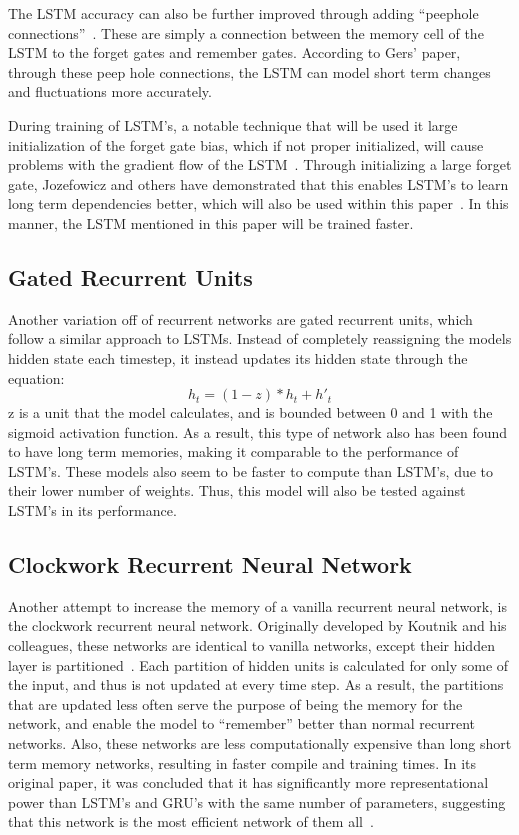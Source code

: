 \documentclass{article}
\begin{document}
The LSTM accuracy can also be further improved through adding ``peephole
connections''~\cite{lstmpeep}. These are simply a connection between the memory
cell of the LSTM to the forget gates and remember gates. According to Gers'
paper, through these peep hole connections, the LSTM can model short term
changes and fluctuations more accurately.

During training of LSTM's, a notable technique that will be used it large
initialization of the forget gate bias, which if not proper initialized, will
cause problems with the gradient flow of the LSTM~\cite{lstmbias}. Through
initializing a large forget gate, Jozefowicz and others have demonstrated that
this enables LSTM's to learn long term dependencies better, which will also be
used within this paper~\cite{lstmbias}. In this manner, the LSTM mentioned in
this paper will be trained faster.


\subsection{Gated Recurrent Units}
Another variation off of recurrent networks are gated recurrent units, which
follow a similar approach to LSTMs. Instead of completely reassigning the models
hidden state each timestep, it instead updates its hidden state through the
equation:
$$h_t = (1 - z) * h_t + h'_t $$
z is a unit that the model calculates, and is bounded between 0 and 1 with the
sigmoid activation function. As a result, this type of network also has been
found to have long term memories, making it comparable to the performance of
LSTM's. These models also seem to be faster to compute than LSTM's, due to their
lower number of weights. Thus, this model will also be tested against LSTM's in
its performance.


\subsection{Clockwork Recurrent Neural Network}
Another attempt to increase the memory of a vanilla recurrent neural network, is
the clockwork recurrent neural network. Originally developed by Koutnik and his
colleagues, these networks are identical to vanilla networks, except their
hidden layer is partitioned~\cite{cw-rnn}. Each partition of hidden units is
calculated for only some of the input, and thus is not updated at every time
step. As a result, the partitions that are updated less often serve the purpose
of being the memory for the network, and enable the model to ``remember'' better
than normal recurrent networks. Also, these networks are less computationally
expensive than long short term memory networks, resulting in faster compile and
training times. In its original paper, it was concluded that it has
significantly more representational power than LSTM's and GRU's with the same
number of parameters, suggesting that this network is the most efficient network
of them all~\cite{cw-rnn}.
\end{document}
